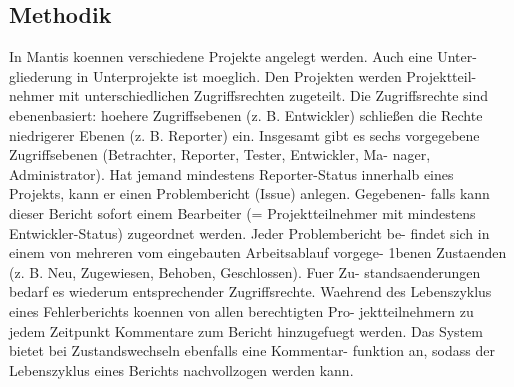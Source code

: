 \subsection{Methodik}
In Mantis koennen verschiedene Projekte angelegt werden. Auch eine Unter-
gliederung in Unterprojekte ist moeglich. Den Projekten werden Projektteil-
nehmer mit unterschiedlichen Zugriffsrechten zugeteilt. Die Zugriffsrechte
sind ebenenbasiert: hoehere Zugriffsebenen (z. B. Entwickler) schließen die
Rechte niedrigerer Ebenen (z. B. Reporter) ein. Insgesamt gibt es sechs
vorgegebene Zugriffsebenen (Betrachter, Reporter, Tester, Entwickler, Ma-
nager, Administrator). Hat jemand mindestens Reporter-Status innerhalb
eines Projekts, kann er einen Problembericht (Issue) anlegen. Gegebenen-
falls kann dieser Bericht sofort einem Bearbeiter (= Projektteilnehmer mit
mindestens Entwickler-Status) zugeordnet werden. Jeder Problembericht be-
findet sich in einem von mehreren vom eingebauten Arbeitsablauf vorgege-
1benen Zustaenden (z. B. Neu, Zugewiesen, Behoben, Geschlossen). Fuer Zu-
standsaenderungen bedarf es wiederum entsprechender Zugriffsrechte. Waehrend
des Lebenszyklus eines Fehlerberichts koennen von allen berechtigten Pro-
jektteilnehmern zu jedem Zeitpunkt Kommentare zum Bericht hinzugefuegt
werden. Das System bietet bei Zustandswechseln ebenfalls eine Kommentar-
funktion an, sodass der Lebenszyklus eines Berichts nachvollzogen werden
kann.



